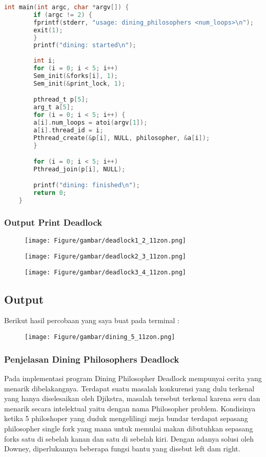 \documentclass[11pt,a4paper]{article}
\begin{document}
\begin{lstlisting}[language=C, caption= Source code,label={labelkode}]
    int main(int argc, char *argv[]) {
        if (argc != 2) {
	    fprintf(stderr, "usage: dining_philosophers <num_loops>\n");
	    exit(1);
        }
        printf("dining: started\n");
    
        int i;
        for (i = 0; i < 5; i++) 
	    Sem_init(&forks[i], 1);
        Sem_init(&print_lock, 1);

        pthread_t p[5];
        arg_t a[5];
        for (i = 0; i < 5; i++) {
	    a[i].num_loops = atoi(argv[1]);
	    a[i].thread_id = i;
	    Pthread_create(&p[i], NULL, philosopher, &a[i]);
        }

        for (i = 0; i < 5; i++) 
	    Pthread_join(p[i], NULL); 

        printf("dining: finished\n");
        return 0;
    }
    \end{lstlisting}
    
\newpage   
\subsubsection{\textbf{Output Print Deadlock}}
    \begin{figure}[h]
    \centering
    \texttt{[image: Figure/gambar/deadlock1\_2\_11zon.png]}
    \label{fig:my_label}
    
    \centering
    \texttt{[image: Figure/gambar/deadlock2\_3\_11zon.png]}
    \label{fig:my_label}
    
    \centering
    \texttt{[image: Figure/gambar/deadlock3\_4\_11zon.png]}
    \label{fig:my_label}
\end{figure} 

\newpage
\subsection{\textbf{Output}}
    Berikut hasil percobaan yang saya buat pada terminal :
    
    \begin{figure}[h]
        \centering
        \texttt{[image: Figure/gambar/dining\_5\_11zon.png]}
        \label{fig:asg6_1}
    \end{figure}

\subsubsection{\textbf{Penjelasan Dining Philosophers Deadlock}}
Pada implementasi program Dining Philosopher Deadlock mempunyai cerita yang menarik dibelakangnya. Terdapat suatu masalah konkurensi yang dulu terkenal yang hanya diselesaikan oleh Djikstra, masalah tersebut terkenal karena seru dan menarik secara intelektual yaitu dengan nama Philosopher problem. Kondisinya ketika 5 philoshoper yang duduk mengelilingi meja bundar terdapat sepasang philosopher single fork yang mana untuk memulai makan dibutuhkan sepasang forks satu di sebelah kanan dan satu di sebelah kiri. Dengan adanya solusi oleh Downey, diperlukannya beberapa fungsi bantu yang disebut left dam right.
\end{document}

